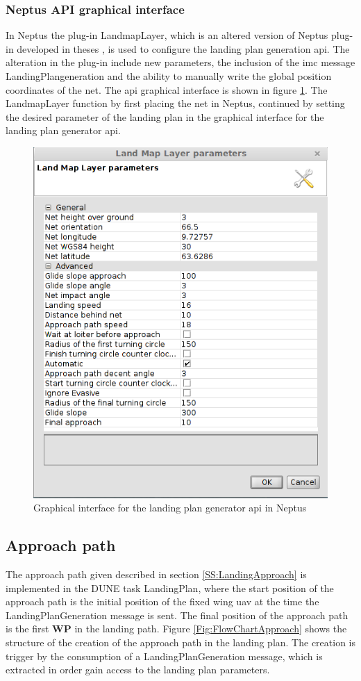 \subsubsection{Neptus API graphical interface}
In Neptus the plug-in LandmapLayer, which is an altered version of Neptus plug-in developed in theses \citep{Froelich}, is used to configure the landing plan generation \gls{api}. The alteration in the plug-in include new parameters, the inclusion of the \gls{imc} message LandingPlangeneration and the ability to manually write the global position coordinates of the net. The \gls{api} graphical interface is shown in figure \ref{Fig:LandMapLayer}. The LandmapLayer function by first placing the net in Neptus, continued by setting the desired parameter of the landing plan in the graphical interface for the landing plan generator \gls{api}.
\begin{figure}[H]
\centering
\includegraphics[scale=0.6]{figs/LandMapLayer.png}
\caption{Graphical interface for the landing plan  generator \gls{api} in Neptus}
\label{Fig:LandMapLayer}
\end{figure}
\subsection{Approach path}
The approach path given described in section \ref{SS:LandingApproach} is implemented in the DUNE task LandingPlan, where the start position of the approach path is the initial position of the fixed wing \gls{uav} at the time the LandingPlanGeneration message is sent. The final position of the approach path is the first $\textbf{WP}$ in the landing path. Figure \ref{Fig:FlowChartApproach} shows the structure of the creation of the approach path in the landing plan. The creation is trigger by the consumption of a LandingPlanGeneration message, which is extracted in order gain access to the landing plan parameters. 

